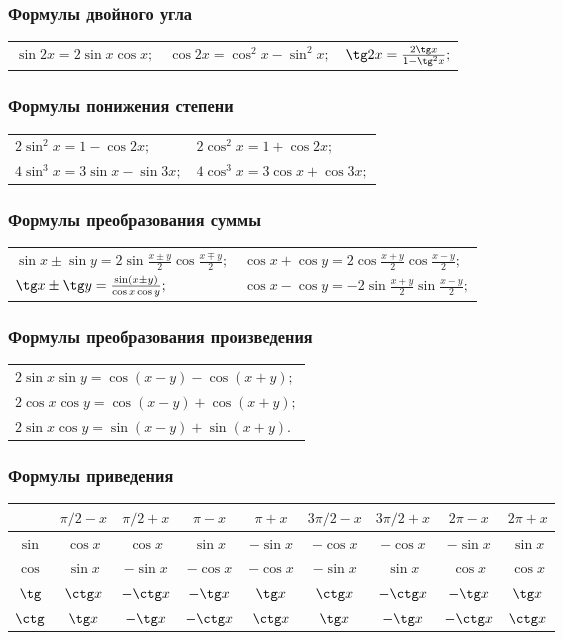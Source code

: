 \subsubsection{Формулы двойного угла}
\begin{longtable}[l]{l l l}
$\sin 2x = 2\sin x \cos x;$
&
$\cos 2x = \cos^2 x - \sin^2 x;$
&
$\tg 2x = \frac{2\tg x}{1-\tg^2x};$
\end{longtable}

\subsubsection{Формулы понижения степени}
\begin{longtable}[l]{ l l }
$2\sin^2x=1-\cos 2x;$
&
$2\cos^2x=1+\cos 2x;$
\\
$4\sin^3x=3\sin x-\sin 3x;$
&
$4\cos^3x=3\cos x+\cos 3x;$
\end{longtable}

\subsubsection{Формулы преобразования суммы}
\begin{longtable}[l]{ l l}
$\sin x\pm \sin y =2 \sin \frac{x\pm y}{2} \cos \frac{x\mp y}{2};$
&
$\cos x + \cos y  = 2 \cos \frac{x + y}{2} \cos \frac{x - y}{2};$
\\
$\tg x \pm \tg y = \frac{\sin (x \pm y)}{ \cos x \cos y};$
&
$\cos x - \cos y  = -2 \sin \frac{x + y}{2} \sin\frac{x - y}{2};$
\end{longtable}

\subsubsection{Формулы преобразования произведения}
\begin{longtable}[l]{l}
$2\sin x \sin y = \cos (x-y)-\cos(x+y);$
\\
$2\cos x \cos y = \cos (x-y)+\cos(x+y);$
\\
$2\sin x \cos y = \sin (x-y)+\sin(x+y).$
\end{longtable}

\subsubsection{Формулы приведения}
\tiny
\begin{longtable}{|c|c|c|c|c|c|c|c|c|}
\hline
&
$\pi/2-x$
&
$\pi/2+x$
&
$\pi-x$
&
$\pi+x$
&
$3\pi/2-x$
&
$3\pi/2+x$
&
$2\pi-x$
&
$2\pi+x$
\\\hline
$\sin$
&
$\cos x$
&
$\cos x$
&
$\sin x$
&
$-\sin x$
&
$-\cos x$
&
$-\cos x$
&
$-\sin x$
&
$\sin x$
\\\hline
$\cos$
&
$\sin x$
&
$-\sin x$
&
$-\cos x$
&
$-\cos x$
&
$-\sin x$
&
$\sin x$
&
$\cos x$
&
$\cos x$
\\\hline
$\tg$
&
$\ctg x$
&
$-\ctg x$
&
$-\tg x$
&
$\tg x$
&
$\ctg x$
&
$-\ctg x$
&
$-\tg x$
&
$\tg x$
\\\hline
$\ctg$
&
$\tg x$
&
$-\tg x$
&
$-\ctg x$
&
$\ctg x$
&
$\tg x$
&
$-\tg x$
&
$-\ctg x$
&
$\ctg x$
\\\hline
\end{longtable}

